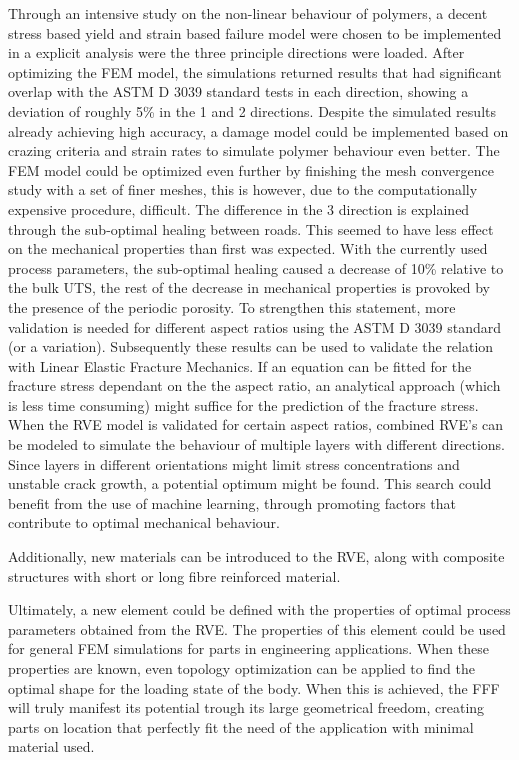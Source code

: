 Through an intensive study on the non-linear behaviour of polymers, a decent stress based yield and strain based failure model were chosen to be implemented in a explicit analysis were the three principle directions were loaded. After optimizing the FEM model, the simulations returned results that had significant overlap with the ASTM D 3039 standard tests in each direction, showing a deviation of roughly 5\% in the 1 and 2 directions. Despite the simulated results already achieving high accuracy, a damage model could be implemented based on crazing criteria and strain rates to simulate polymer behaviour even better. The FEM model could be optimized even further by finishing the mesh convergence study with a set of finer meshes, this is however, due to the computationally expensive procedure, difficult. The difference in the 3 direction is explained through the sub-optimal healing between roads. This seemed to have less effect on the mechanical properties than first was expected. With the currently used process parameters, the sub-optimal healing caused a decrease of 10\% relative to the bulk UTS, the rest of the decrease in mechanical properties is provoked by the presence of the periodic porosity. To strengthen this statement, more validation is needed for different aspect ratios using the ASTM D 3039 standard (or a variation).  Subsequently these results can be used to validate the relation with Linear Elastic Fracture Mechanics. If an equation can be fitted for the fracture stress dependant on the the aspect ratio, an analytical approach (which is less time consuming) might suffice for the prediction of the fracture stress. 
When the RVE model is validated for certain aspect ratios, combined RVE's can be modeled to simulate the behaviour of multiple layers with different directions. Since layers in different orientations might limit stress concentrations and unstable crack growth, a potential optimum might be found. This search could benefit from the use of machine learning, through promoting factors that contribute to optimal mechanical behaviour. 

Additionally, new materials can be introduced to the RVE, along with composite structures with short or long fibre reinforced material.  

Ultimately, a new element could be defined with the properties of optimal process parameters obtained from the RVE. The properties of this element could be used for general FEM simulations for parts in engineering applications. When these properties are known, even topology optimization can be applied to find the optimal shape for the loading state of the body. 
When this is achieved, the FFF will truly manifest its potential trough its large geometrical freedom, creating parts on location that perfectly fit the need of the application with minimal material used. 


